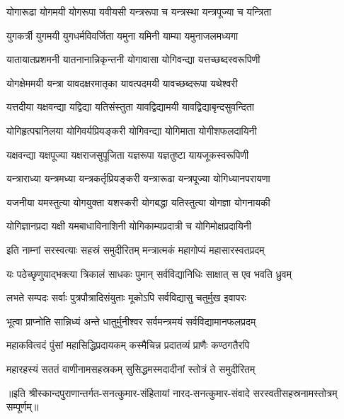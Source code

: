 \twolineshloka
{योगारूढा योगमयी योगरूपा यवीयसी}
{यन्त्ररूपा च यन्त्रस्था यन्त्रपूज्या च यन्त्रिता}%

\twolineshloka
{युगकर्त्री युगमयी युगधर्मविवर्जिता}
{यमुना यमिनी याम्या यमुनाजलमध्यगा}%

\twolineshloka
{यातायातप्रशमनी यातनानान्निकृन्तनी}
{योगावासा योगिवन्द्या यत्तच्छब्दस्वरूपिणी}%

\twolineshloka
{योगक्षेममयी यन्त्रा यावदक्षरमातृका}
{यावत्पदमयी यावच्छब्दरूपा यथेश्वरी}%

\twolineshloka
{यत्तदीया यक्षवन्द्या यद्विद्या यतिसंस्तुता}
{यावद्विद्यामयी यावद्विद्याबृन्दसुवन्दिता}%

\twolineshloka
{योगिहृत्पद्मनिलया योगिवर्यप्रियङ्करी}
{योगिवन्द्या योगिमाता योगीशफलदायिनी}%

\twolineshloka
{यक्षवन्द्या यक्षपूज्या यक्षराजसुपूजिता}
{यज्ञरूपा यज्ञतुष्टा यायजूकस्वरूपिणी}%

\twolineshloka
{यन्त्राराध्या यन्त्रमध्या यन्त्रकर्तृप्रियङ्करी}
{यन्त्रारूढा यन्त्रपूज्या योगिध्यानपरायणा}%

\twolineshloka
{यजनीया यमस्तुत्या योगयुक्ता यशस्करी}
{योगबद्धा यतिस्तुत्या योगज्ञा योगनायकी}%

\twolineshloka
{योगिज्ञानप्रदा यक्षी यमबाधाविनाशिनी}
{योगिकाम्यप्रदात्री च योगिमोक्षप्रदायिनी}%


 \resetShloka

\twolineshloka
{इति नाम्नां सरस्वत्याः सहस्रं समुदीरितम्}
{मन्त्रात्मकं महागोप्यं महासारस्वतप्रदम्}%

\twolineshloka
{यः पठेच्छृणुयाद्भक्त्या त्रिकालं साधकः पुमान्}
{सर्वविद्यानिधिः साक्षात् स एव भवति ध्रुवम्}%

\twolineshloka
{लभते सम्पदः सर्वाः पुत्रपौत्रादिसंयुताः}
{मूकोऽपि सर्वविद्यासु चतुर्मुख इवापरः}%

\twolineshloka
{भूत्वा प्राप्नोति सान्निध्यं अन्ते धातुर्मुनीश्वर}
{सर्वमन्त्रमयं सर्वविद्यामानफलप्रदम्}%

\twolineshloka
{महाकवित्वदं पुंसां महासिद्धिप्रदायकम्}
{कस्मैचिन्न प्रदातव्यं प्राणैः कण्ठगतैरपि}%

\twolineshloka
{महारहस्यं सततं वाणीनामसहस्रकम्}
{सुसिद्धमस्मदादीनां स्तोत्रं ते समुदीरितम्}%


॥इति श्रीस्कान्दपुराणान्तर्गत-सनत्कुमार-संहितायां नारद-सनत्कुमार-संवादे सरस्वतीसहस्रनामस्तोत्रम् सम्पूर्णम्॥
